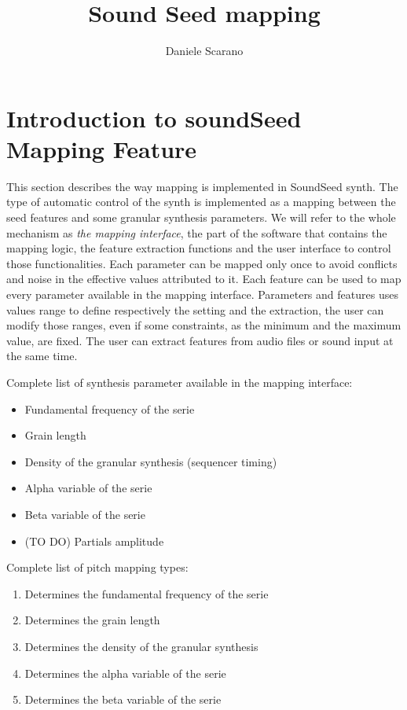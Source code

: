 \documentclass[11pt,oneside]{article}
\title{Sound Seed mapping}
\author{Daniele Scarano}
\date{}
\begin{document}
\maketitle

\section{Introduction to soundSeed Mapping Feature}
This section describes the way mapping is implemented in SoundSeed synth. The type of automatic control of the synth is implemented as a mapping between the seed features and some granular synthesis parameters. We will refer to the whole mechanism as \emph{the mapping interface}, the part of the software that contains the mapping logic, the feature extraction functions and the user interface to control those functionalities. Each parameter can be mapped only once to avoid conflicts and noise in the effective values attributed to it. Each feature can be used to map every parameter available in the mapping interface. Parameters and features uses values range to define respectively the setting and the extraction, the user can modify those ranges, even if some constraints, as the minimum and the maximum value, are fixed. The user can extract features from audio files or sound input at the same time.

Complete list of synthesis parameter available in the mapping interface:
\begin{itemize}
    \item Fundamental frequency of the serie
    \item Grain length
    \item Density of the granular synthesis (sequencer timing)
    \item Alpha variable of the serie
    \item Beta variable of the serie
    \item (TO DO) Partials amplitude
\end{itemize}

Complete list of pitch mapping types:
\begin{enumerate}
    \item Determines the fundamental frequency of the serie
    \item Determines the grain length
    \item Determines the density of the granular synthesis
    \item Determines the alpha variable of the serie
    \item Determines the beta variable of the serie
\end{enumerate}
\end{document}
